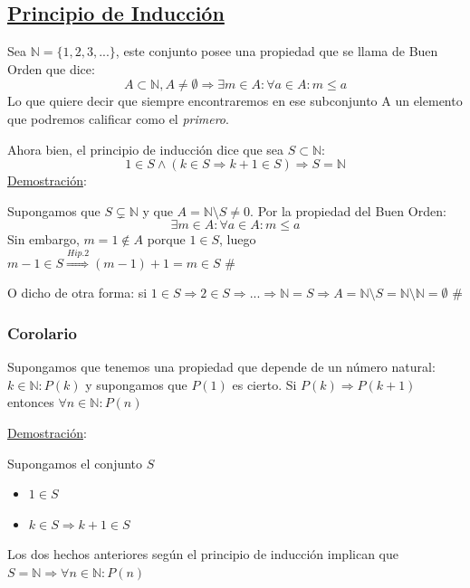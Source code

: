 \documentclass[10pt,a4paper,openright]{book}
\theoremstyle{break}
\begin{document}
\subsection{\underline{Principio de Inducción}}
Sea $\mathbb N=\{1, 2, 3,...\}$, este conjunto posee una propiedad que se llama de Buen Orden que dice:
$$A\subset \mathbb N, A\neq \emptyset \Rightarrow \exists m \in A : \forall a \in A : m\leq a$$
Lo que quiere decir que siempre encontraremos en ese subconjunto A un elemento que podremos calificar como el \textit{primero}.\par
Ahora bien, el principio de inducción dice que sea $S\subset \mathbb N$:
$$1\in S\wedge (k\in S\Rightarrow k+1\in S)\Rightarrow S=\mathbb N$$
\underline{Demostración}:\par
Supongamos que $S\subsetneq \mathbb N$ y que $A=\mathbb N\mbox{\textbackslash} S\neq 0$. Por la propiedad del Buen Orden:
$$\exists m \in A : \forall a \in A: m\leq a$$
Sin embargo, $m=1\notin A$ porque $1\in S$, luego $m-1\in S\stackrel{Hip. 2}{\Rightarrow} (m-1)+1=m\in S \mbox{ \#}$\par
O dicho de otra forma: si $1\in S\Rightarrow 2\in S \Rightarrow ... \Rightarrow \mathbb N=S\Rightarrow A=\mathbb N \mbox{\textbackslash} S=\mathbb N \mbox{\textbackslash} \mathbb N=\emptyset \mbox{ \#}$
\subsubsection{Corolario}
Supongamos que tenemos una propiedad que depende de un número natural: $k \in \mathbb N : P(k)$ y supongamos que $P(1)$ es cierto. Si $P(k)\Rightarrow P(k+1)$ entonces $\forall n \in \mathbb N : P(n)$

\underline{Demostración}:\par
Supongamos el conjunto $S$
\begin{itemize}
\item $1\in S$
\item $k\in S\Rightarrow k+1\in S$
\end{itemize}
Los dos hechos anteriores según el principio de inducción implican que $S=\mathbb N\Rightarrow \forall n \in \mathbb N : P(n)$
\end{document}
